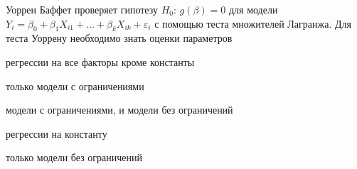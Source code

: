 
\begin{question}
Уоррен Баффет проверяет гипотезу \(H_0\): \(g(\beta)=0\) для модели
\(Y_i = \beta_0 + \beta_1 X_{i1} + \ldots + \beta_k X_{ik} + \varepsilon_i\)
с помощью теста множителей Лагранжа. Для теста Уоррену необходимо знать
оценки параметров
\begin{answerlist}
  \item регрессии на все факторы кроме константы
  \item только модели с ограничениями
  \item модели с ограничениями, и модели без ограничений
  \item регрессии на константу
  \item только модели без ограничений
\end{answerlist}
\end{question}


